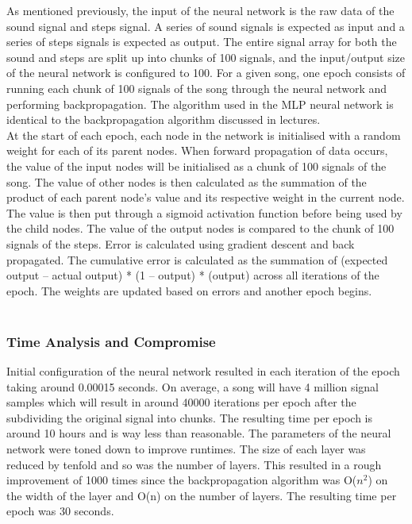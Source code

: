 As mentioned previously, the input of the neural network is the raw data of the sound signal and steps signal. A series of sound signals is expected as input and a series of steps signals is expected as output. The entire signal array for both the sound and steps are split up into chunks of 100 signals, and the input/output size of the neural network is configured to 100. For a given song, one epoch consists of running each chunk of 100 signals of the song through the neural network and performing backpropagation.
The algorithm used in the MLP neural network is identical to the backpropagation algorithm discussed in lectures.\\

 At the start of each epoch, each node in the network is initialised with a random weight for each of its parent nodes. When forward propagation of data occurs, the value of the input nodes will be initialised as a chunk of 100 signals of the song. The value of other nodes is then calculated as the summation of the product of each parent node’s value and its respective weight in the current node. The value is then put through a sigmoid activation function before being used by the child nodes. The value of the output nodes is compared to the chunk of 100 signals of the steps. Error is calculated using gradient descent and back propagated. The cumulative error is calculated as the summation of (expected output – actual output) * (1 – output) * (output) across all iterations of the epoch. The weights are updated based on errors and another epoch begins. \\\\
 
 
\subsubsection{Time Analysis and Compromise}
Initial configuration of the neural network resulted in each iteration of the epoch taking around 0.00015 seconds. On average, a song will have 4 million signal samples which will result in around 40000 iterations per epoch after the subdividing the original signal into chunks. The resulting time per epoch is around 10 hours and is way less than reasonable. The parameters of the neural network were toned down to improve runtimes. The size of each layer was reduced by tenfold and so was the number of layers. This resulted in a rough improvement of 1000 times since the backpropagation algorithm was O($n^2$) on the width of the layer and O(n) on the number of layers. The resulting time per epoch was 30 seconds.\\

